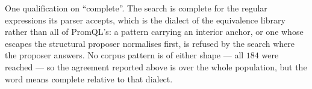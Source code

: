 \begin{remark}\label{rem:complete-dialect}
One qualification on ``complete''. The search is complete for the regular expressions its
parser accepts, which is the dialect of the equivalence library rather than all of
PromQL's: a pattern carrying an interior anchor, or one whose escapes the structural
proposer normalises first, is refused by the search where the proposer answers. No corpus
pattern is of either shape --- all $184$ were reached --- so the agreement reported above
is over the whole population, but the word means complete relative to that dialect.
\end{remark}
